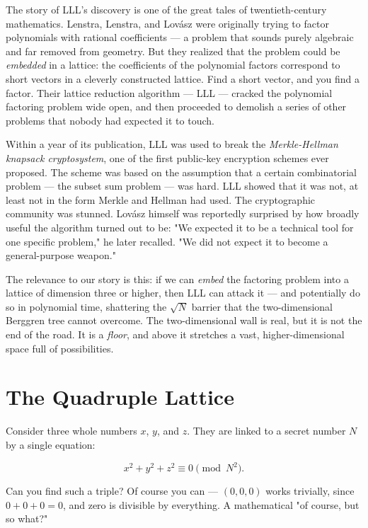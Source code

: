 The story of LLL's discovery is one of the great tales of twentieth-century mathematics. Lenstra, Lenstra, and Lovász were originally trying to factor polynomials with rational coefficients --- a problem that sounds purely algebraic and far removed from geometry. But they realized that the problem could be \textit{embedded} in a lattice: the coefficients of the polynomial factors correspond to short vectors in a cleverly constructed lattice. Find a short vector, and you find a factor. Their lattice reduction algorithm --- LLL --- cracked the polynomial factoring problem wide open, and then proceeded to demolish a series of other problems that nobody had expected it to touch.

Within a year of its publication, LLL was used to break the \textit{Merkle-Hellman knapsack cryptosystem}, one of the first public-key encryption schemes ever proposed. The scheme was based on the assumption that a certain combinatorial problem --- the subset sum problem --- was hard. LLL showed that it was not, at least not in the form Merkle and Hellman had used. The cryptographic community was stunned. Lovász himself was reportedly surprised by how broadly useful the algorithm turned out to be: "We expected it to be a technical tool for one specific problem," he later recalled. "We did not expect it to become a general-purpose weapon."

The relevance to our story is this: if we can \textit{embed} the factoring problem into a lattice of dimension three or higher, then LLL can attack it --- and potentially do so in polynomial time, shattering the $\sqrt{N}$ barrier that the two-dimensional Berggren tree cannot overcome. The two-dimensional wall is real, but it is not the end of the road. It is a \textit{floor}, and above it stretches a vast, higher-dimensional space full of possibilities.

\bigskip

\section*{The Quadruple Lattice}

Consider three whole numbers $x$, $y$, and $z$. They are linked to a secret number $N$ by a single equation:

\[
x^2 + y^2 + z^2 \equiv 0 \pmod{N^2}.
\]

Can you find such a triple? Of course you can --- $(0, 0, 0)$ works trivially, since $0 + 0 + 0 = 0$, and zero is divisible by everything. A mathematical "of course, but so what?"

